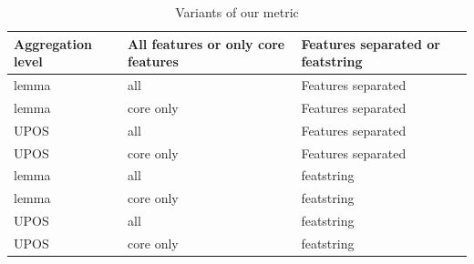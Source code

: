 \documentclass[USenglish]{article}
\begin{document}
\begin{table}[ht]
    \centering
    \caption{Variants of our metric} %
    \label{tab:our_metrics_list}   
    \begin{tabular}{p{2.5cm}p{4cm}p{4.5cm}}
\toprule
	\textbf{Aggregation level}	&	\textbf{All features or only core features}	&	\textbf{Features separated or featstring}	\\
    \midrule
 lemma& all & Features separated \\ \midrule
  lemma& core only& Features separated \\ \midrule
   UPOS& all& Features separated\\ \midrule
   UPOS& core only& Features separated\\ \midrule
   lemma& all& featstring\\ \midrule
  lemma& core only& featstring\\ \midrule
   UPOS& all& featstring\\ \midrule
  UPOS& core only& featstring\\ \bottomrule
    \end{tabular}
\end{table}


\end{document}

